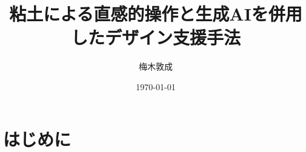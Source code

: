 \documentclass[dvipdfmx]{jlreq}
\title{粘土による直感的操作と生成AIを併用したデザイン支援手法}
\author{梅木敦成}
\date{\today}
\begin{document}
\maketitle




\section{はじめに}
\end{document}
